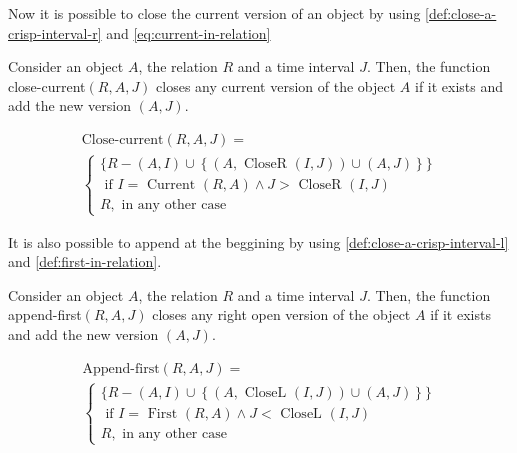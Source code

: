 Now it is possible to close the current version of an object by using \eqref{def:close-a-crisp-interval-r} and \eqref{eq:current-in-relation}

\begin{definition}
\label{def:close-current-version}
Consider an object $A$, the relation $R$ and a time interval $J$. Then, the function close-current$\left(R,A,J \right)$ closes any current version of the object $A$ if it exists and add the new version $\left(A, J \right)$.

\begin{eqnarray}
\text{Close-current} \left(R, A, J \right) =\\
\begin{cases}
\nonumber
\big \lbrace R - \left(A, I \right) \cup \left \lbrace \left(A, \mbox{ CloseR } \left(I, J\right) \right) \cup \left(A, J\right)\right \rbrace  \big \rbrace \\
\nonumber
\mbox{ if } I = \mbox{ Current } \left(R, A \right) \wedge J > \mbox{ CloseR } \left(I, J \right)   \\
\nonumber R , \text{ in any other case}
\end{cases}
\end{eqnarray}
\end{definition}

It is also possible to append at the beggining by using \eqref{def:close-a-crisp-interval-l} and \eqref{def:first-in-relation}.
\begin{definition}
\label{def:append-first-version}
Consider an object $A$, the relation $R$ and a time interval $J$. Then, the function append-first$\left(R,A,J \right)$ closes any right open version of the object $A$ if it exists and add the new version $\left(A, J \right)$.

\begin{eqnarray}
\text{Append-first} \left(R, A, J \right) =\\
\begin{cases}
\nonumber
\big \lbrace R - \left(A, I \right) \cup \left \lbrace \left(A, \mbox{ CloseL } \left(I, J\right) \right) \cup \left(A, J\right)\right \rbrace  \big \rbrace \\
\nonumber
\mbox{ if } I = \mbox{ First } \left(R, A \right) \wedge J < \mbox{ CloseL } \left(I, J \right)   \\
\nonumber R , \text{ in any other case}
\end{cases}
\end{eqnarray}
\end{definition}

